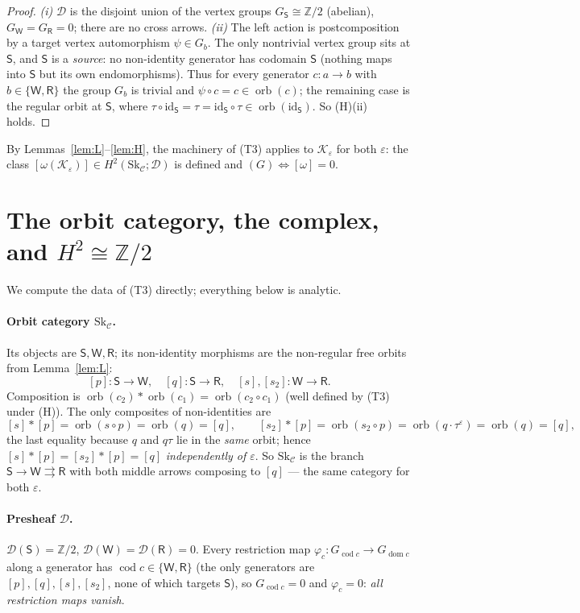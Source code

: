 \documentclass[11pt]{article}
\theoremstyle{definition}
\newcommand{\id}{\mathrm{id}}
\newcommand{\C}{\mathcal{C}}
\newcommand{\D}{\mathcal{D}}
\newcommand{\K}{\mathcal{K}}
\newcommand{\Sk}{\mathrm{Sk}}
\newcommand{\dom}{\operatorname{dom}}
\newcommand{\cod}{\operatorname{cod}}
\newcommand{\orb}{\operatorname{orb}}
\newcommand{\Sup}{\mathsf{S}}
\newcommand{\Wk}{\mathsf{W}}
\newcommand{\Rt}{\mathsf{R}}
\begin{document}
\begin{proof}
\emph{(i)} $\D$ is the disjoint union of the vertex groups $G_\Sup\cong\mathbb Z/2$
(abelian), $G_\Wk=G_\Rt=0$; there are no cross arrows. \emph{(ii)} The left action
is postcomposition by a target vertex automorphism $\psi\in G_b$. The only
nontrivial vertex group sits at $\Sup$, and $\Sup$ is a \emph{source}: no
non-identity generator has codomain $\Sup$ (nothing maps into $\Sup$ but its own
endomorphisms). Thus for every generator $c:a\to b$ with $b\in\{\Wk,\Rt\}$ the group
$G_b$ is trivial and $\psi\circ c=c\in\orb(c)$; the remaining case is the regular
orbit at $\Sup$, where $\tau\circ\id_\Sup=\tau=\id_\Sup\circ\tau\in\orb(\id_\Sup)$.
So (H)(ii) holds.
\end{proof}

By Lemmas~\ref{lem:L}--\ref{lem:H}, the machinery of (T3) applies to
$\K_\varepsilon$ for both $\varepsilon$: the class $[\omega(\K_\varepsilon)]\in
H^2(\Sk_\C;\D)$ is defined and $(G)\Leftrightarrow[\omega]=0$.

\section{The orbit category, the complex, and $H^2\cong\mathbb Z/2$}\label{sec:h2}

We compute the data of (T3) directly; everything below is analytic.

\paragraph{Orbit category $\Sk_\C$.} Its objects are $\Sup,\Wk,\Rt$; its
non-identity morphisms are the non-regular free orbits from
Lemma~\ref{lem:L}:
\[
   [p]:\Sup\to\Wk,\quad [q]:\Sup\to\Rt,\quad [s],[s_2]:\Wk\to\Rt.
\]
Composition is $\orb(c_2)\ast\orb(c_1)=\orb(c_2\circ c_1)$ (well defined by (T3)
under (H)). The only composites of non-identities are
\[
   [s]\ast[p]=\orb(s\circ p)=\orb(q)=[q],\qquad
   [s_2]\ast[p]=\orb(s_2\circ p)=\orb(q\cdot\tau^\varepsilon)=\orb(q)=[q],
\]
the last equality because $q$ and $q\tau$ lie in the \emph{same} orbit; hence
$[s]\ast[p]=[s_2]\ast[p]=[q]$ \emph{independently of $\varepsilon$}. So
$\Sk_\C$ is the branch $\Sup\to\Wk\rightrightarrows\Rt$ with both middle arrows
composing to $[q]$ --- the same category for both $\varepsilon$.

\paragraph{Presheaf $\D$.} $\D(\Sup)=\mathbb Z/2$, $\D(\Wk)=\D(\Rt)=0$. Every
restriction map $\varphi_c:G_{\cod c}\to G_{\dom c}$ along a generator has
$\cod c\in\{\Wk,\Rt\}$ (the only generators are $[p],[q],[s],[s_2]$, none of which
targets $\Sup$), so $G_{\cod c}=0$ and $\varphi_c=0$: \emph{all restriction maps
vanish}.
\end{document}
